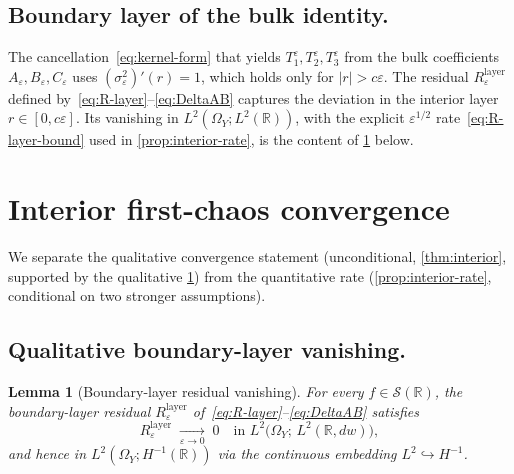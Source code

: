 \documentclass[11pt,reqno]{amsart}
\theoremstyle{plain}
\newtheorem{lemma}[theorem]{Lemma}
\theoremstyle{definition}
\theoremstyle{remark}
\newcommand{\R}{\mathbb{R}}
\begin{document}
\subsection*{Boundary layer of the bulk identity.}\label{ssec:boundary-layer}
The cancellation~\eqref{eq:kernel-form} that yields
$T_{1}^{\varepsilon},T_{2}^{\varepsilon},T_{3}^{\varepsilon}$ from
the bulk coefficients $A_{\varepsilon},B_{\varepsilon},C_{\varepsilon}$
uses $(\sigma_{\varepsilon}^{2})'(r)=1$, which holds only for
$|r|>c\varepsilon$. The residual $R_{\varepsilon}^{\mathrm{layer}}$
defined by~\eqref{eq:R-layer}--\eqref{eq:DeltaAB} captures the
deviation in the interior layer $r\in[0,c\varepsilon]$. Its
vanishing in $L^{2}(\Omega_{Y};L^{2}(\R))$, with the explicit
$\varepsilon^{1/2}$ rate~\eqref{eq:R-layer-bound} used in
\cref{prop:interior-rate}, is the content of
\cref{lem:bdy-layer-vanish} below.

\section{Interior first-chaos convergence}\label{sec:interior}

We separate the qualitative convergence statement (unconditional,
\cref{thm:interior}, supported by the qualitative
\cref{lem:bdy-layer-vanish}) from the quantitative rate
(\cref{prop:interior-rate}, conditional on two stronger
assumptions).

\subsection*{Qualitative boundary-layer vanishing.}

\begin{lemma}[Boundary-layer residual vanishing]\label{lem:bdy-layer-vanish}
For every $f\in\mathscr S(\R)$, the boundary-layer residual
$R_{\varepsilon}^{\mathrm{layer}}$ of~\eqref{eq:R-layer}--\eqref{eq:DeltaAB}
satisfies
\[
 R_{\varepsilon}^{\mathrm{layer}}\;\xrightarrow[\varepsilon\to 0]{}\;0
 \quad\text{in }L^{2}\bigl(\Omega_{Y};\,L^{2}(\R,dw)\bigr),
\]
and hence in $L^{2}(\Omega_{Y};H^{-1}(\R))$ via the continuous
embedding $L^{2}\hookrightarrow H^{-1}$.
\end{lemma}
\end{document}
